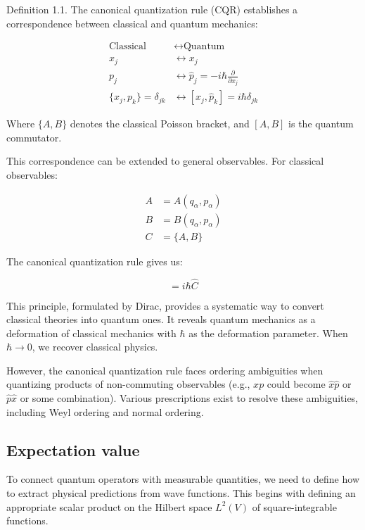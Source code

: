 \documentclass[italian]{HKNdocument}
\begin{document}
Definition 1.1. The canonical quantization rule (CQR) establishes a correspondence between classical and quantum mechanics:

\begin{align}
\text{Classical} &\longleftrightarrow \text{Quantum} \\
x_j &\longleftrightarrow x_j \\
p_j &\longleftrightarrow \hat{p}_j = -i\hbar\frac{\partial}{\partial x_j}  \\
\{x_j, p_k\} = \delta_{jk} &\longleftrightarrow [x_j, \hat{p}_k] = i\hbar\delta_{jk}
\end{align}

Where $\{A,B\}$ denotes the classical Poisson bracket, and $[A,B]$ is the quantum commutator.

This correspondence can be extended to general observables. For classical observables:

\begin{align}
A &= A(q_\alpha, p_\alpha) \\
B &= B(q_\alpha, p_\alpha)  \\
C &= \{A, B\}
\end{align}

The canonical quantization rule gives us:

\begin{equation}
[\hat{A}, \hat{B}] = i\hbar\hat{C}
\end{equation}

This principle, formulated by Dirac, provides a systematic way to convert classical theories into quantum ones. It reveals quantum mechanics as a deformation of classical mechanics with $\hbar$ as the deformation parameter. When $\hbar \to 0$, we recover classical physics.

However, the canonical quantization rule faces ordering ambiguities when quantizing products of non-commuting observables (e.g., $xp$ could become $\hat{x}\hat{p}$ or $\hat{p}\hat{x}$ or some combination). Various prescriptions exist to resolve these ambiguities, including Weyl ordering and normal ordering.

\subsection{Expectation value}

To connect quantum operators with measurable quantities, we need to define how to extract physical predictions from wave functions. This begins with defining an appropriate scalar product on the Hilbert space $L^2(V)$ of square-integrable functions.
\end{document}
